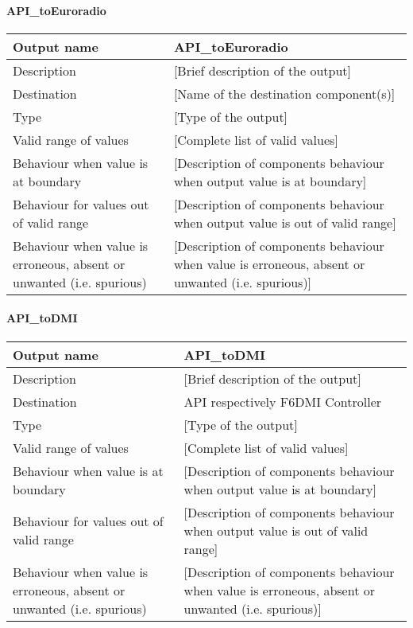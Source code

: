 \paragraph{API\_toEuroradio}

\begin{longtable}{p{}p{}}
\toprule
Output name				& API\_toEuroradio \\
\midrule
Description				& [Brief description of the output] \\
\midrule
Destination				& [Name of the destination component(s)] \\ 
\midrule
Type					& [Type of the output] \\
\midrule
Valid range of values	& [Complete list of valid values] \\
\midrule
Behaviour when value is at boundary	& [Description of components behaviour when output value is at boundary] \\
\midrule
Behaviour for values out of valid range	& [Description of components behaviour when output value is out of valid range] \\
\midrule
Behaviour when value is erroneous, absent or unwanted (i.e. spurious) & [Description of components behaviour when value is erroneous, absent or unwanted (i.e. spurious)] \\
\bottomrule
\end{longtable}


\paragraph{API\_toDMI}

\begin{longtable}{p{}p{}}
\toprule
Output name				& API\_toDMI \\
\midrule
Description				& [Brief description of the output] \\
\midrule
Destination				& API respectively F6DMI Controller \\ 
\midrule
Type					& [Type of the output] \\
\midrule
Valid range of values	& [Complete list of valid values] \\
\midrule
Behaviour when value is at boundary	& [Description of components behaviour when output value is at boundary] \\
\midrule
Behaviour for values out of valid range	& [Description of components behaviour when output value is out of valid range] \\
\midrule
Behaviour when value is erroneous, absent or unwanted (i.e. spurious) & [Description of components behaviour when value is erroneous, absent or unwanted (i.e. spurious)] \\
\bottomrule
\end{longtable}

